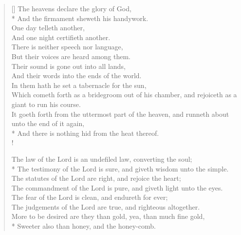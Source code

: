 \documentclass[MAIN]{subfiles}
\begin{document}
\settowidth{\versewidth}{The law of the Lord is an undefiled law, converting the soul;}
\begin{verse}[\versewidth]
The heavens declare the glory of God,\\*
\vin And the firmament sheweth his handywork.\\
One day telleth another,\\
\vin And one night certifieth another.\\
There is neither speech nor language,\\
\vin But their voices are heard among them.\\
Their sound is gone out into all lands,\\
\vin And their words into the ends of the world.\\
In them hath he set a tabernacle for the sun,\\
\vin Which cometh forth as a bridegroom out of his chamber, and rejoiceth as a giant to run his course.\\
It goeth forth from the uttermost part of the heaven, and runneth about unto the end of it again,\\*
\vin And there is nothing hid from the heat thereof.\\!

The law of the Lord is an undefiled law, converting the soul;\\*
\vin The testimony of the Lord is sure, and giveth wisdom unto the simple.\\
The statutes of the Lord are right, and rejoice the heart;\\
\vin The commandment of the Lord is pure, and giveth light unto the eyes.\\
The fear of the Lord is clean, and endureth for ever;\\
\vin The judgements of the Lord are true, and righteous altogether.\\
More to be desired are they than gold, yea, than much fine gold,\\*
\vin Sweeter also than honey, and the honey-comb.
\end{verse}
\end{document}
